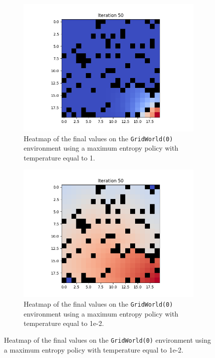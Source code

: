 \documentclass{article}
\begin{document}
\begin{enumerate}[(a)]
\begin{figure}[h!]
    \centering
    \begin{subfigure}{0.3\textwidth}
        \centering
        \includegraphics[width=\textwidth]{figures/part_1_b_t1.png}
        \caption{Heatmap of the final values on the \texttt{GridWorld(0)} environment using a maximum entropy policy with temperature equal to 1.}
    \end{subfigure}
    \hspace{0.1 in}
    \begin{subfigure}{0.3\textwidth}
        \centering
        \includegraphics[width=\textwidth]{figures/part_1_b_t1e-2.png}
        \caption{Heatmap of the final values on the \texttt{GridWorld(0)} environment using a maximum entropy policy with temperature equal to 1e-2.}

\end{subfigure}
\end{figure}
\end{enumerate}
\end{document}
